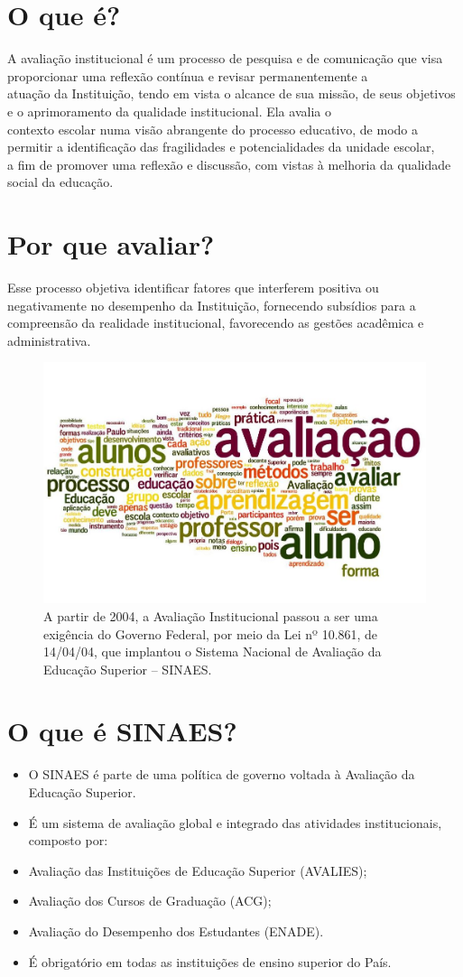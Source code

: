 \documentclass[final]{beamer}
\author{A. Beatriz ~ F.L. Pinheiro ~ M. Gabriel ~ T. Brunacci ~ V. Henrique}
\begin{document}
\begin{poster} 
\newcolumn

\section{O que é?}

A avaliação institucional é um processo de pesquisa e de comunicação que visa proporcionar uma reflexão contínua e revisar permanentemente a\\ atuação da Instituição, tendo em vista o alcance de sua missão, de seus objetivos e o aprimoramento da qualidade institucional.  Ela avalia o\\ contexto escolar numa visão abrangente do processo educativo, de modo a permitir a identificação das fragilidades e potencialidades da unidade escolar,\\ a fim de promover uma reflexão e discussão, com vistas à melhoria da qualidade social da educação.

\section{Por que avaliar?}
Esse processo objetiva identificar fatores que interferem positiva ou negativamente no desempenho da Instituição, fornecendo subsídios para a compreensão da realidade institucional, favorecendo as gestões acadêmica e administrativa.

\begin{figure}%
\centerline{\includegraphics[width=.3\columnwidth]{cloud}}
\caption{A partir de 2004, a Avaliação Institucional passou a ser uma exigência do Governo Federal, por meio da Lei nº 10.861, de 14/04/04, que implantou o Sistema Nacional de Avaliação da Educação Superior – SINAES.}%
\end{figure}

\section{O que é SINAES?}
\begin{itemize}
	\item O SINAES é parte de uma política de governo voltada à Avaliação da Educação Superior.
	\item É um sistema de avaliação global e integrado das atividades institucionais, composto por:
	\item Avaliação das Instituições de Educação Superior (AVALIES); 
	\item Avaliação dos Cursos de Graduação (ACG); 
	\item Avaliação do Desempenho dos Estudantes (ENADE). 
	\item É obrigatório em todas as instituições de ensino superior do País.
\end{itemize}


\end{poster}
\end{document}
